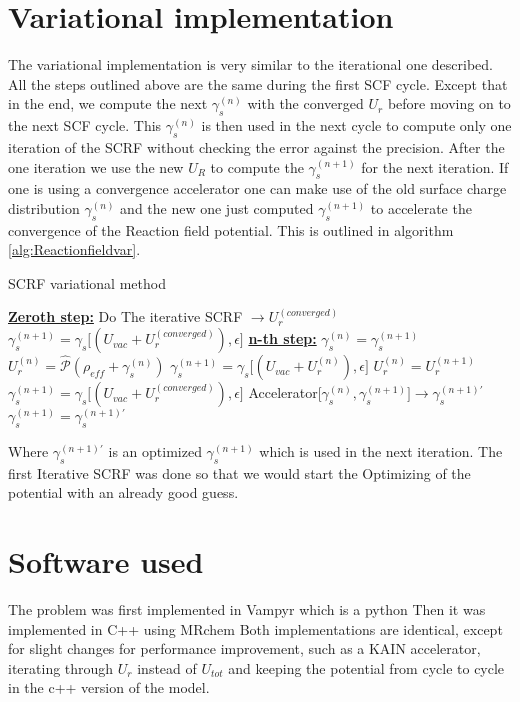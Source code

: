 \documentclass[../master_thesis.tex]{subfiles}
\begin{document}
\section{Variational implementation}
The variational implementation is very similar to the iterational one described.
All the steps outlined above are the same during the first \ac{SCF} cycle. Except
that in the end, we compute the next $\gamma_s^{(n)}$ with the converged $U_r$ before
moving on to the next \ac{SCF} cycle. This $\gamma_s^{(n)}$ is then used in the next cycle
to compute only one iteration of the \ac{SCRF} without checking the error against the
precision. After the one iteration we use the new $U_R$ to compute the $\gamma_s^{(n+1)}$
for the next iteration. If one is using a convergence accelerator one can make
use of the old surface charge distribution $\gamma_s^{(n)}$ and the new one just computed
$\gamma_s^{(n+1)}$ to accelerate the convergence of the Reaction field potential.
This is outlined in algorithm \ref{alg:Reactionfieldvar}.
\begin{algorithm}
  \caption{\ac{SCRF} variational method}\label{alg:Reactionfieldvar}
  \begin{algorithmic}
    \STATE \underline{\textbf{Zeroth step:}}
    \STATE Do The iterative \ac{SCRF} $\rightarrow U_r^{(converged)}$
    \STATE $\gamma_s^{(n+1)} = \gamma_s\big[(U_{vac}+ U_r^{(converged)}), \epsilon\big]$
    \STATE \underline{\textbf{n-th step:}}
      \STATE $\gamma_s^{(n)} =\gamma_s^{(n+1)}$
      \STATE $U_r^{(n)} = \hat{\mathscr{P}} (\rho_{eff} + \gamma_s^{(n)})$
      \STATE $\gamma_s^{(n+1)} = \gamma_s\big[(U_{vac}+ U_r^{(n)}), \epsilon\big]$
      \STATE $U_r^{(n)} = U_r^{(n+1)}$
      \STATE $\gamma_s^{(n+1)} = \gamma_s\big[(U_{vac}+ U_r^{(converged)}), \epsilon\big]$
      \STATE Accelerator[$\gamma_s^{(n)}, \gamma_s^{(n+1)}] \rightarrow \gamma_s^{(n+1)\prime}$
      \STATE $\gamma_s^{(n+1)} =\gamma_s^{(n+1)\prime}$
    \ENDFOR
  \end{algorithmic}
\end{algorithm}
Where $\gamma_s^{(n+1)\prime}$ is an optimized $\gamma_s^{(n+1)}$ which is used
in the next iteration. The first Iterative \ac{SCRF} was done so that we would
start the Optimizing of the potential with an already good guess.
\section{Software used}
The problem was first implemented in Vampyr %
which is a python %
Then it was implemented in C++ using MRchem %
Both implementations are identical, except for slight changes for
performance improvement, such as a KAIN accelerator, %
iterating through $U_r$ instead of $U_{tot}$ %
and keeping the potential from cycle to cycle
in the c++ version of the model.



\biblio
\end{document}
